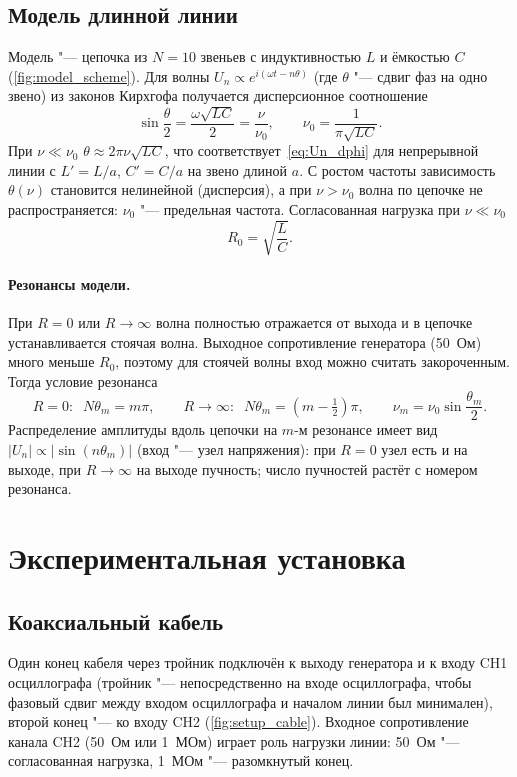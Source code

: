 \documentclass[a4paper,12pt]{article}
\begin{document}
\subsection{Модель длинной линии}
Модель "--- цепочка из $N = 10$ звеньев с индуктивностью $L$ и ёмкостью
$C$ (\cref{fig:model_scheme}). Для волны $U_n\propto e^{i(\omega t-n\theta)}$
(где $\theta$ "--- сдвиг фаз на одно звено) из законов Кирхгофа
получается дисперсионное соотношение
\begin{equation}
    \label{eq:chain_dispersion}
    \sin\frac{\theta}{2} = \frac{\omega\sqrt{LC}}{2} = \frac{\nu}{\nu_0},
    \qquad
    \nu_0 = \frac{1}{\pi\sqrt{LC}}.
\end{equation}
При $\nu\ll\nu_0$ $\theta\approx2\pi\nu\sqrt{LC}$, что
соответствует~\eqref{eq:Un_dphi} для непрерывной линии с $L' = L/a$,
$C' = C/a$ на звено длиной $a$. С ростом частоты зависимость $\theta(\nu)$
становится нелинейной (дисперсия), а при $\nu>\nu_0$ волна по цепочке не
распространяется: $\nu_0$ "--- предельная частота. Согласованная нагрузка
при $\nu\ll\nu_0$
\begin{equation}
    \label{eq:R0_model}
    R_0 = \sqrt{\frac{L}{C}}.
\end{equation}

\paragraph{Резонансы модели.} При $R = 0$ или $R\to\infty$ волна
полностью отражается от выхода и в цепочке устанавливается стоячая волна.
Выходное сопротивление генератора (50~Ом) много меньше $R_0$, поэтому для
стоячей волны вход можно считать закороченным. Тогда условие резонанса
\begin{equation}
    \label{eq:model_res}
    R = 0:\;\; N\theta_m = m\pi,
    \qquad
    R\to\infty:\;\; N\theta_m = \left(m-\tfrac12\right)\pi,
    \qquad
    \nu_m = \nu_0\sin\frac{\theta_m}{2}.
\end{equation}
Распределение амплитуды вдоль цепочки на $m$-м резонансе имеет вид
$|U_n|\propto|\sin(n\theta_m)|$ (вход "--- узел напряжения): при
$R = 0$ узел есть и на выходе, при $R\to\infty$ на выходе пучность;
число пучностей растёт с номером резонанса.

\section{Экспериментальная установка}

\subsection{Коаксиальный кабель}
Один конец кабеля через тройник подключён к выходу генератора и к входу
CH1 осциллографа (тройник "--- непосредственно на входе осциллографа,
чтобы фазовый сдвиг между входом осциллографа и началом линии был
минимален), второй конец "--- ко входу CH2 (\cref{fig:setup_cable}).
Входное сопротивление канала CH2 (50~Ом или 1~МОм) играет роль нагрузки
линии: 50~Ом "--- согласованная нагрузка, 1~МОм "--- разомкнутый конец.
\end{document}

